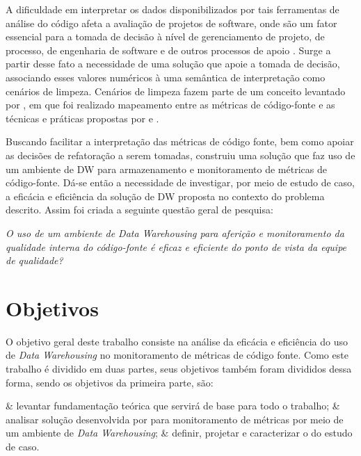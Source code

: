 A dificuldade em interpretar os dados disponibilizados por tais ferramentas de análise do código afeta a avaliação de projetos de software, onde são um fator essencial para a tomada de decisão à nível de gerenciamento de projeto, de processo, de engenharia de software e de outros processos de apoio \cite{pandian_software_2004}. Surge a partir desse fato a necessidade de uma solução que apoie a tomada de decisão, associando esses valores numéricos à uma semântica de interpretação como cenários de limpeza. Cenários de limpeza fazem parte de um conceito levantado por , em que foi realizado mapeamento entre as métricas de código-fonte e as técnicas e práticas propostas por  e .

Buscando facilitar a interpretação das métricas de código fonte, bem como apoiar as decisões de refatoração a serem tomadas,  construiu uma solução que faz uso de um ambiente de DW para armazenamento e monitoramento de métricas de código-fonte. Dá-se então a necessidade de investigar, por meio de estudo de caso, a eficácia e eficiência da solução de DW proposta no contexto do problema descrito. Assim foi criada a seguinte questão geral de pesquisa:

\textit{O uso de um ambiente de Data Warehousing para aferição e monitoramento da qualidade interna do código-fonte é eficaz e eficiente do ponto de vista da equipe de qualidade?}

\section{Objetivos}

O objetivo geral deste trabalho consiste na análise da eficácia e eficiência do uso de \textit{Data Warehousing} no monitoramento de métricas de código fonte. Como este trabalho é dividido em duas partes, seus objetivos também foram divididos dessa forma, sendo os objetivos da primeira parte, são:

\begin{easylist}[itemize]	
	
	& levantar fundamentação teórica que servirá de base para todo o trabalho;
	& analisar solução desenvolvida por  para monitoramento de métricas por meio de um ambiente de \textit{Data Warehousing}; 
	& definir, projetar e caracterizar o do estudo de caso.
	
	
	\end{easylist}	

